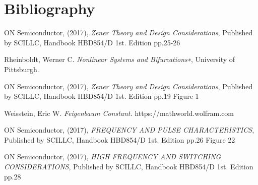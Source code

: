 \documentclass[10pt,twocolumn,letterpaper]{article}
\begin{document}
\section*{Bibliography}
\begin{thebibliography}{9}

ON Semiconductor, (2017), \emph{Zener Theory and Design Considerations}, Published by SCILLC, Handbook HBD854/D 1st. Edition pp.25-26 

Rheinboldt, Werner C.  \emph{Nonlinear Systems and Bifurcations∗}, University of Pittsburgh.

ON Semiconductor, (2017), \emph{Zener Theory and Design Considerations}, Published by SCILLC, Handbook HBD854/D 1st. Edition pp.19 Figure 1

Weisstein, Eric W. \emph{Feigenbaum Constant.} https://mathworld.wolfram.com

ON Semiconductor, (2017), \emph{FREQUENCY AND PULSE CHARACTERISTICS}, Published by SCILLC, Handbook HBD854/D 1st. Edition pp.26 Figure 22

ON Semiconductor, (2017), \emph{HIGH FREQUENCY AND SWITCHING
CONSIDERATIONS}, Published by SCILLC, Handbook HBD854/D 1st. Edition pp.28

\end{thebibliography}
\end{document}
